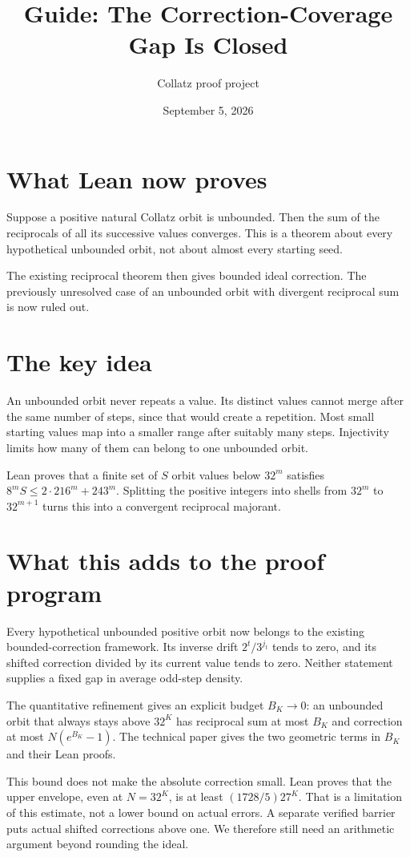 \documentclass[10pt]{article}
\title{Guide: The Correction-Coverage Gap Is Closed}
\author{Collatz proof project}
\date{September 5, 2026}
\begin{document}
\maketitle
\section*{What Lean now proves}
Suppose a positive natural Collatz orbit is unbounded. Then the sum of the
reciprocals of all its successive values converges. This is a theorem about
every hypothetical unbounded orbit, not about almost every starting seed.

The existing reciprocal theorem then gives bounded ideal correction.
The previously unresolved case of an unbounded orbit with divergent
reciprocal sum is now ruled out.

\section*{The key idea}
An unbounded orbit never repeats a value. Its distinct values cannot merge
after the same number of steps, since that would create a repetition.
Most small starting values map into a smaller range after suitably many
steps. Injectivity limits how many of them can belong to one unbounded orbit.

Lean proves that a finite set of $S$ orbit values below $32^m$ satisfies
$8^mS\le2\cdot216^m+243^m$. Splitting the positive integers into shells
from $32^m$ to $32^{m+1}$ turns this into a convergent reciprocal majorant.

\section*{What this adds to the proof program}
Every hypothetical unbounded positive orbit now belongs to the existing
bounded-correction framework. Its inverse drift $2^t/3^{j_t}$ tends to zero,
and its shifted correction divided by its current value tends to zero.
Neither statement supplies a fixed gap in average odd-step density.

The quantitative refinement gives an explicit budget $B_K\to0$: an
unbounded orbit that always stays above $32^K$ has reciprocal sum at most
$B_K$ and correction at most $N(e^{B_K}-1)$. The technical paper gives
the two geometric terms in $B_K$ and their Lean proofs.

This bound does not make the absolute correction small. Lean proves that
the upper envelope, even at $N=32^K$, is at least $(1728/5)27^K$.
That is a limitation of this estimate, not a lower bound on actual errors.
A separate verified barrier puts actual shifted corrections above one.
We therefore still need an arithmetic argument beyond rounding the ideal.
\end{document}
